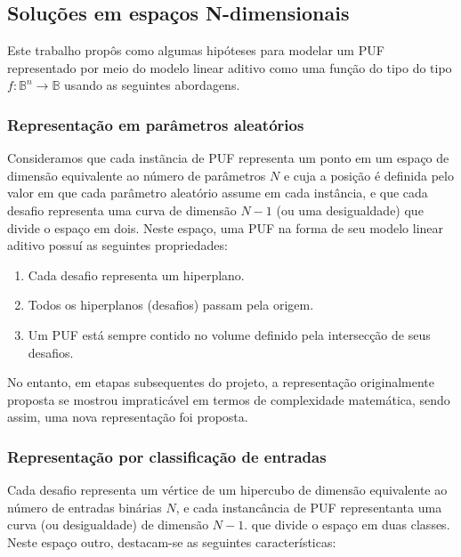 \documentclass[pdftex,11pt]{article}
\begin{document}
\begin{spacing}{1.5}
\subsection{Soluções em espaços N-dimensionais}

Este trabalho propôs como algumas hipóteses para modelar um PUF representado por meio do modelo linear aditivo como uma função do tipo do tipo $f: \mathbb{B}^n \to \mathbb{B}$ usando as seguintes abordagens.


\subsubsection{Representação em parâmetros aleatórios}\label{sec:polytope}

Consideramos que cada instãncia de PUF representa um ponto em um espaço de
dimensão equivalente ao número de parâmetros $N$ e cuja a posição
é definida pelo valor em que cada parâmetro aleatório assume em cada instância, e que
cada desafio representa uma curva de dimensão $N-1$ (ou uma desigualdade) que divide
o espaço em dois. Neste espaço, uma PUF na forma de seu modelo linear aditivo possuí
as seguintes propriedades:


\begin{spacing}{1.0}
\begin{enumerate}
\item Cada desafio representa um hiperplano.
\item Todos os hiperplanos (desafios) passam pela origem.
\item Um PUF está sempre contido no volume definido pela intersecção de seus desafios.
\end{enumerate}
\end{spacing}


No entanto, em etapas subsequentes do projeto, a representação originalmente proposta
se mostrou impraticável em termos de complexidade matemática, sendo assim, uma nova
representação foi proposta.

\subsubsection{Representação por classificação de entradas}\label{sec:hypercube}

Cada desafio representa um vértice de um hipercubo
de dimensão equivalente ao número de entradas binárias $N$, e cada  instancância
de PUF representanta
uma curva (ou desigualdade) de dimensão $N-1$. que divide o espaço em duas classes.
Neste espaço outro, destacam-se as seguintes características:



\end{spacing}
\end{document}
